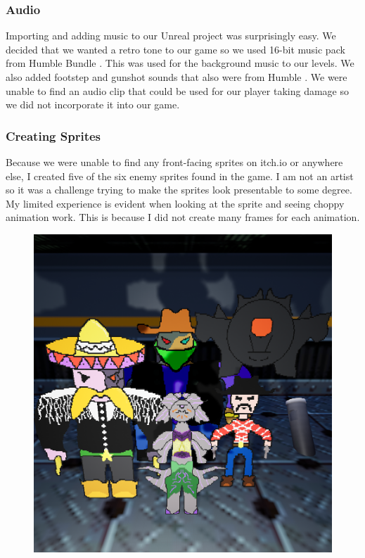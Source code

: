 \documentclass{sigchi}
\begin{document}
\subsubsection*{Audio}
Importing and adding music to our Unreal project was surprisingly easy. We decided that we wanted a retro tone to our game so we used 16-bit music pack from Humble Bundle \cite{humble}. This was used for the background music to our levels. We also added footstep and gunshot sounds that also were from Humble \cite{humble}. We were unable to find an audio clip that could be used for our player taking damage so we did not incorporate it into our game. 
\subsubsection*{Creating Sprites}
Because we were unable to find any front-facing sprites on itch.io \cite{itch} or anywhere else, I created five of the six enemy sprites found in the game. I am not an artist so it was a challenge trying to make the sprites look presentable to some degree. My limited experience is evident when looking at the sprite and seeing choppy animation work. This is because I did not create many frames for each animation. 
\begin{figure}
	\centering
	\includegraphics[scale=0.2]{sprite.png}
\end{figure}
\end{document}
